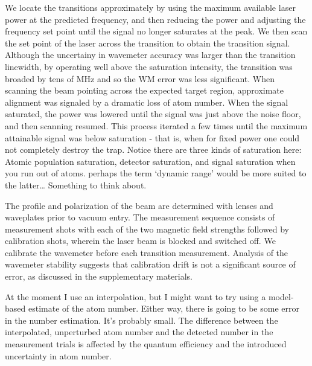 	We locate the transitions approximately by using the maximum available laser power at the predicted frequency, and then reducing the power and adjusting the frequency set point until the signal no longer saturates at the peak.
	We then scan the set point of the laser across the transition to obtain the transition signal.
	Although the uncertainy in wavemeter accuracy was larger than the transition linewidth, by operating well above the saturation intensity, the transition was broaded by tens of MHz and so the WM error was less significant.
	When scanning the beam pointing across the expected target region, approximate alignment was signaled by a dramatic loss of atom number.
	When the signal saturated, the power was lowered until the signal was just above the noise floor, and then scanning resumed.
	This process iterated a few times until the maximum attainable signal was below saturation - that is, when for fixed power one could not completely destroy the trap.
	Notice there are three kinds of saturation here: Atomic population saturation, detector saturation, and signal saturation when you run out of atoms.
	perhaps the term `dynamic range' would be more suited to the latter\ldots{} Something to think about.

	The profile and polarization of the beam are determined with lenses and waveplates prior to vacuum entry.
	The measurement sequence consists of measurement shots with each of the two magnetic field strengths followed by calibration shots, wherein the laser beam is blocked and switched off.
	We calibrate the wavemeter before each transition measurement.
	Analysis of the wavemeter stability suggests that calibration drift is not a significant source of error, as discussed in the supplementary materials.

	At the moment I use an interpolation, but I might want to try using a model-based estimate of the atom number.
	Either way, there is going to be some error in the number estimation.
	It's probably small.
	The difference between the interpolated, unperturbed atom number and the detected number in the measurement trials is affected by the quantum efficiency and the introduced uncertainty in atom number.

